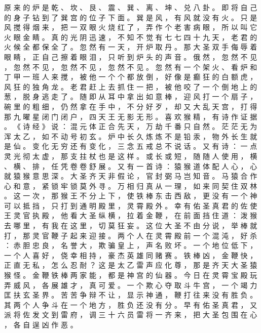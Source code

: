 {原 来 的 炉 是 乾 、 坎 、 艮 、 震 、 巽 、 离 、 坤 、 兑 八 卦 。
即 将 自 己 的 身 子 钻 到 了 巽 宫 的 位 子 下 面 。
巽 是 风 ， 有 风 就 没 有 火 。
只 是 风 搅 得 烟 来 ， 把 一 双 眼 火 烧 红 了 ， 弄 作 个 老 害 病 眼 ， 所 以 叫 它 火 眼 金 睛 。
真 的 光 阴 迅 速 ， 不 知 不 觉 有 七 七 四 十 九 天 ， 老 君 的 火 候 全 都 保 全 了 。
忽 然 有 一 天 ， 开 炉 取 丹 。
那 大 圣 双 手 侮 辱 着 眼 睛 ， 正 自 己 擦 着 眼 泪 ， 只 听 到 炉 头 的 声 音 。
俄 然 ， 忽 然 不 见 ， 忽 然 不 见 ， 忽 然 不 见 ， 忽 然 不 见 。
忽 然 有 一 个 架 火 、 看 炉 和 丁 甲 一 班 人 来 搅 ， 被 他 一 个 个 都 放 倒 ， 好 像 是 癫 狂 的 白 额 虎 ， 风 狂 的 独 角 龙 。
老 君 赶 上 去 抓 住 一 把 ， 被 他 咬 了 一 个 倒 地 上 的 葱 ， 脱 身 逃 走 了 。
随 即 从 耳 中 拿 出 如 意 棒 ， 迎 风 打 一 个 扇 子 ， 碗 里 的 粗 细 ， 仍 然 拿 在 手 中 ， 不 分 好 歹 ， 却 又 大 乱 天 宫 ， 打 得 那 九 曜 星 闭 门 闭 户 ， 四 天 王 无 影 无 形 。
喜 欢 猴 精 ， 有 诗 作 证 据 。
《 诗 经 》 说 ： 混 元 体 正 合 先 天 ， 万 劫 千 番 只 自 然 。
茫 茫 无 为 浑 太 乙 ， 如 不 动 号 初 玄 。
炉 中 长 久 炼 炼 不 是 铅 汞 ， 物 外 长 生 就 是 仙 。
变 化 无 穷 还 有 变 化 ， 三 念 五 戒 总 不 说 话 。
又 有 诗 ： 一 点 灵 光 彻 太 虚 ， 那 支 拄 杖 也 是 这 样 。
或 长 或 短 ， 随 随 人 使 用 ， 横 、 横 、 排 ， 任 凭 卷 卷 舒 展 。
又 有 一 首 诗 ： 猿 猴 道 体 配 人 心 ， 心 就 猿 猴 意 思 深 。
大 圣 齐 天 非 假 论 ， 官 封 弼 马 岂 知 音 。
马 猿 合 作 心 和 意 ， 紧 锁 牢 锁 莫 外 寻 。
万 相 归 真 从 一 理 ， 如 来 同 契 住 双 林 。
这 一 次 ， 那 猴 王 不 分 上 下 ， 使 铁 棒 东 击 西 敌 ， 更 没 有 一 个 神 可 以 抵 挡 ， 只 打 到 通 明 殿 里 ， 灵 霄 殿 外 。
幸 有 佑 圣 真 君 的 佐 使 王 灵 官 执 殿 ， 他 看 大 圣 纵 横 ， 拉 着 金 鞭 ， 在 前 面 挡 住 道 ： 泼 猴 去 哪 里 ， 有 我 在 这 里 ， 切 莫 狂 妄 。
这 位 大 圣 不 由 分 说 ， 举 棒 就 打 ， 那 灵 官 鞭 子 起 来 迎 接 。
两 个 人 在 灵 霄 殿 前 一 个 混 沌 ， 好 杀 ： 赤 胆 忠 良 ， 名 誉 大 ， 欺 骗 皇 上 ， 声 名 败 坏 。
一 个 地 位 低 下 ， 一 个 人 喜 好 ， 侥 幸 相 持 ， 豪 杰 英 雄 同 赌 赛 。
铁 棒 凶 ， 金 鞭 快 ， 正 直 无 私 ， 怎 么 忍 耐 ？ 这 是 太 乙 雷 声 应 化 尊 ， 那 是 齐 天 大 圣 猿 猴 怪 。
金 鞭 铁 棒 两 家 能 ， 都 是 神 宫 的 仙 器 。
今 日 在 灵 霄 宝 殿 玩 弄 威 风 ， 各 展 雄 才 ， 真 可 爱 。
一 个 欺 心 夺 取 斗 牛 宫 ， 一 个 竭 力 匡 扶 玄 圣 界 。
苦 苦 争 辩 不 让 ， 显 示 神 通 ， 鞭 打 往 来 没 有 胜 负 。
其 两 个 人 争 斗 在 一 个 地 方 ， 胜 负 还 没 有 分 。
早 有 佑 圣 真 君 ， 又 派 将 佐 发 文 到 雷 府 ， 调 三 十 六 员 雷 将 一 齐 来 ， 把 大 圣 包 围 在 心 ， 各 自 逞 凶 作 恶 。
}
